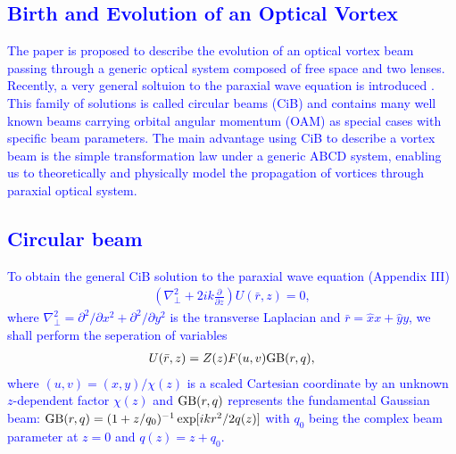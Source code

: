 \textcolor{blue}{
\section{Birth and Evolution of an Optical Vortex \cite{ValBE16}}
The paper is proposed to describe the evolution of an optical vortex beam passing through a generic optical system composed of free space and two lenses. Recently, a very general soltuion to the paraxial wave equation is introduced \cite{CiB08}. This family of solutions is called circular beams (CiB) and contains many well known beams carrying orbital angular momentum (OAM) as special cases with specific beam parameters. The main advantage using CiB to describe a vortex beam is the simple transformation law under a generic ABCD system, enabling us to theoretically and physically model the propagation of vortices through paraxial optical system.
\subsection{Circular beam}
To obtain the general CiB solution to the paraxial wave equation (Appendix III)
\begin{eqnarray}
	\left(\nabla_{\perp}^2 + 2ik \frac{\partial}{\partial z} \right) U(\bar{r}, z) = 0,
\end{eqnarray}
where $\nabla_{\perp}^2 = \partial^2 / \partial x^2 + \partial^2 / \partial y^2$ is the transverse Laplacian and $\bar{r} = \hat{x} x + \hat{y} y$, we shall perform the seperation of variables
\begin{eqnarray}
	U(\bar{r}, z) = Z(z) F(u, v) {\rm GB}(r, q),
\end{eqnarray}
where $(u, v) = (x, y)/\chi(z)$ is a scaled Cartesian coordinate by an unknown $z$-dependent factor $\chi(z)$ and ${\rm GB}(r, q)$ represents the fundamental Gaussian beam: ${\rm GB}(r, q) = (1 + z/q_0)^{-1} \exp[ i k r^2/ 2q(z)]$ with $q_0$ being the complex beam parameter at $z = 0$ and $q(z) = z + q_0$.
}